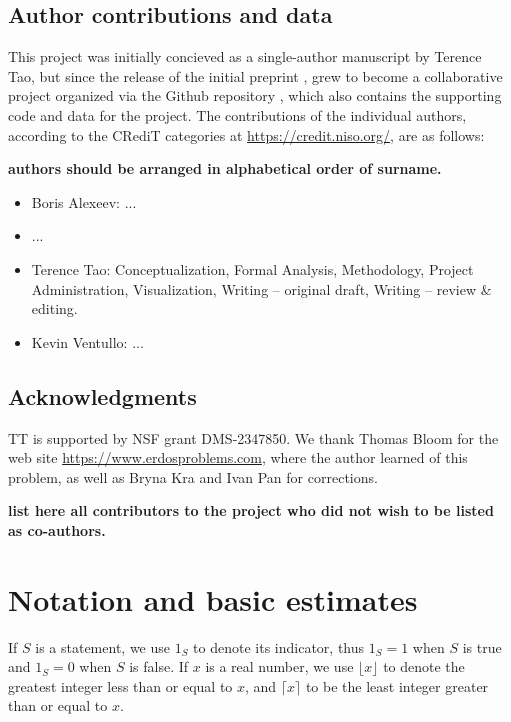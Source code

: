 \documentclass[12pt,a4paper,reqno]{amsart}
\numberwithin{equation}{section}
\theoremstyle{plain}
\theoremstyle{definition}
\begin{document}
\subsection{Author contributions and data}

This project was initially concieved as a single-author manuscript by Terence Tao, but since the release of the initial preprint \cite{tao}, grew to become a collaborative project organized via the Github repository \cite{github}, which also contains the supporting code and data for the project.  The contributions of the individual authors, according to the CRediT categories at \url{https://credit.niso.org/}, are as follows:

{\bf authors should be arranged in alphabetical order of surname.  }

\begin{itemize}
\item Boris Alexeev: ...
\item ...
\item Terence Tao: Conceptualization, Formal Analysis, Methodology, Project Administration, Visualization, Writing -- original draft, Writing -- review \& editing.
\item Kevin Ventullo: ...
\end{itemize}

\subsection{Acknowledgments}

TT is supported by NSF grant DMS-2347850.  We thank Thomas Bloom for the web site \url{https://www.erdosproblems.com}, where the author learned of this problem, as well as Bryna Kra and Ivan Pan for  corrections.

{\bf list here all contributors to the project who did not wish to be listed as co-authors.}


\section{Notation and basic estimates}

If $S$ is a statement, we use $1_S$ to denote its indicator, thus $1_S=1$ when $S$ is true and $1_S=0$ when $S$ is false.  If $x$ is a real number, we use $\lfloor x \rfloor$ to denote the greatest integer less than or equal to $x$, and $\lceil x \rceil$ to be the least integer greater than or equal to $x$.
\end{document}
